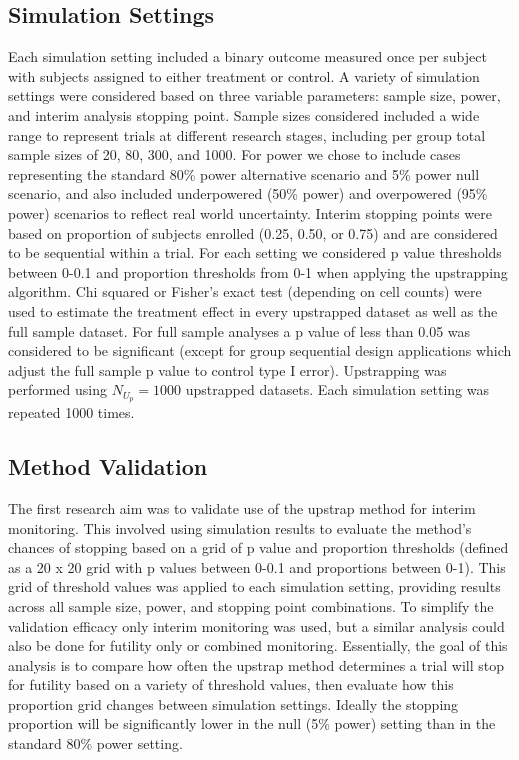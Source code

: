 \documentclass[Afour,sageh,times,square,numbers]{sagej}
\begin{document}
\subsection{Simulation Settings}

Each simulation setting included a binary outcome measured once per subject with subjects assigned to either treatment or control.  A variety of simulation settings were considered based on three variable parameters: sample size, power, and interim analysis stopping point.  Sample sizes considered included a wide range to represent trials at different research stages, including per group total sample sizes of 20, 80, 300, and 1000.  For power we chose to include cases representing the standard 80\% power alternative scenario and 5\% power null scenario, and also included underpowered (50\% power) and overpowered (95\% power) scenarios to reflect real world uncertainty.  Interim stopping points were based on proportion of subjects enrolled (0.25, 0.50, or 0.75) and are considered to be sequential within a trial.  For each setting we considered p value thresholds between 0-0.1 and proportion thresholds from 0-1 when applying the upstrapping algorithm.  Chi squared or Fisher’s exact test (depending on cell counts) were used to estimate the treatment effect in every upstrapped dataset as well as the full sample dataset.  For full sample analyses a p value of less than 0.05 was considered to be significant (except for group sequential design applications which adjust the full sample p value to control type I error).  Upstrapping was performed using $N_{U_p}=1000$ upstrapped datasets.  Each simulation setting was repeated 1000 times.

\subsection{Method Validation}

The first research aim was to validate use of the upstrap method for interim monitoring.  This involved using simulation results to evaluate the method’s chances of stopping based on a grid of p value and proportion thresholds (defined as a 20 x 20 grid with p values between 0-0.1 and proportions between 0-1).  This grid of threshold values was applied to each simulation setting, providing results across all sample size, power, and stopping point combinations.  To simplify the validation efficacy only interim monitoring was used, but a similar analysis could also be done for futility only or combined monitoring.  Essentially, the goal of this analysis is to compare how often the upstrap method determines a trial will stop for futility based on a variety of threshold values, then evaluate how this proportion grid changes between simulation settings.  Ideally the stopping proportion will be significantly lower in the null (5\% power) setting than in the standard 80\% power setting.
\end{document}
